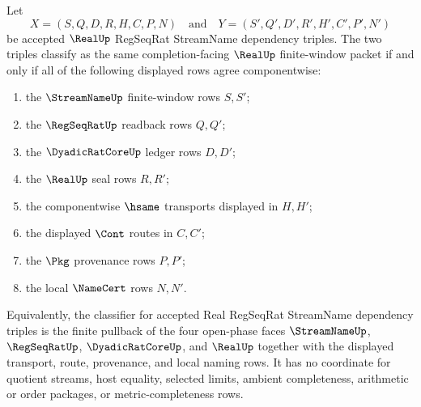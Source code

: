 \begin{theorem}
\label{thm:real-regseq-streamname-finite-window-pullback-classifier}
Let
$$
X=(S,Q,D,R,H,C,P,N)
\quad\text{and}\quad
Y=(S',Q',D',R',H',C',P',N')
$$
be accepted $\RealUp$ RegSeqRat StreamName dependency triples. The two triples
classify as the same completion-facing $\RealUp$ finite-window packet if and
only if all of the following displayed rows agree componentwise:
\begin{enumerate}
\item the $\StreamNameUp$ finite-window rows $S,S'$;
\item the $\RegSeqRatUp$ readback rows $Q,Q'$;
\item the $\DyadicRatCoreUp$ ledger rows $D,D'$;
\item the $\RealUp$ seal rows $R,R'$;
\item the componentwise $\hsame$ transports displayed in $H,H'$;
\item the displayed $\Cont$ routes in $C,C'$;
\item the $\Pkg$ provenance rows $P,P'$;
\item the local $\NameCert$ rows $N,N'$.
\end{enumerate}
Equivalently, the classifier for accepted Real RegSeqRat StreamName dependency
triples is the finite pullback of the four open-phase faces
$\StreamNameUp$, $\RegSeqRatUp$, $\DyadicRatCoreUp$, and $\RealUp$ together
with the displayed transport, route, provenance, and local naming rows. It has
no coordinate for quotient streams, host equality, selected limits, ambient
completeness, arithmetic or order packages, or metric-completeness rows.
\end{theorem}
